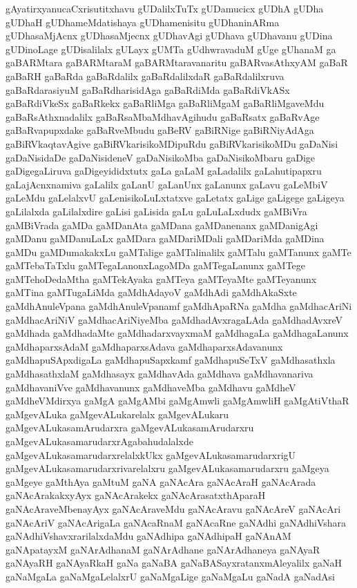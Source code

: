 {gAyatirxyanucaCxrisutitxhavu
gUDalilxTuTx
gUDamucicx
gUDhA
gUDha
gUDhaH
gUDhameMdatishaya
gUDhamenisitu
gUDhaninARma
gUDhasaMjAcnx
gUDhasaMjecnx
gUDhavAgi
gUDhava
gUDhavanu
gUDina
gUDinoLage
gUDisalilalx
gULayx
gUMTa
gUdhwravaduM
gUge
gUhanaM
ga
gaBARMtara
gaBARMtaraM
gaBARMtaravanaritu
gaBARvasAthxyAM
gaBaR
gaBaRH
gaBaRda
gaBaRdalilx
gaBaRdalilxdaR
gaBaRdalilxruva
gaBaRdarasiyuM
gaBaRdharisidAga
gaBaRdiMda
gaBaRdiVkASx
gaBaRdiVkeSx
gaBaRkekx
gaBaRliMga
gaBaRliMgaM
gaBaRliMgaveMdu
gaBaRsAthxnadalilx
gaBaRsaMbaMdhavAgihudu
gaBaRsatx
gaBaRvAge
gaBaRvapupxdake
gaBaRveMbudu
gaBeRV
gaBiRNige
gaBiRNiyAdAga
gaBiRVkaqtavAgive
gaBiRVkarisikoMDipuRdu
gaBiRVkarisikoMDu
gaDaNisi
gaDaNisidaDe
gaDaNisideneV
gaDaNisikoMba
gaDaNisikoMbaru
gaDige
gaDigegaLiruva
gaDigeyididxtutx
gaLa
gaLaM
gaLadalilx
gaLahutipapxru
gaLajAcnxnamiva
gaLalilx
gaLanU
gaLanUnx
gaLanunx
gaLavu
gaLeMbiV
gaLeMdu
gaLelalxvU
gaLenisikoLuLxtatxve
gaLetatx
gaLige
gaLigege
gaLigeya
gaLilalxda
gaLilalxdire
gaLisi
gaLisida
gaLu
gaLuLaLxdudx
gaMBiVra
gaMBiVrada
gaMDa
gaMDanAta
gaMDana
gaMDanenanx
gaMDanigAgi
gaMDanu
gaMDanuLaLx
gaMDara
gaMDariMDali
gaMDariMda
gaMDina
gaMDu
gaMDumakakxLu
gaMTalige
gaMTalinalilx
gaMTalu
gaMTanunx
gaMTe
gaMTebaTaTxlu
gaMTegaLanonxLagoMDa
gaMTegaLanunx
gaMTege
gaMTehoDedaMtha
gaMTekAyaka
gaMTeya
gaMTeyaMte
gaMTeyanunx
gaMTina
gaMTugaLiMda
gaMdhAdayoV
gaMdhAdi
gaMdhAkaSxte
gaMdhAnuleVpana
gaMdhAnuleVpanamf
gaMdhApaRNa
gaMdha
gaMdhacAriNi
gaMdhacAriNiV
gaMdhacAriNiyeMba
gaMdhadAvxragaLAda
gaMdhadAvxreV
gaMdhada
gaMdhadaMte
gaMdhadarxvayxmaM
gaMdhagaLa
gaMdhagaLanunx
gaMdhaparxsAdaM
gaMdhaparxsAdava
gaMdhaparxsAdavanunx
gaMdhapuSApxdigaLa
gaMdhapuSapxkamf
gaMdhapuSeTxV
gaMdhasathxla
gaMdhasathxlaM
gaMdhasayx
gaMdhavAda
gaMdhava
gaMdhavanariva
gaMdhavaniVve
gaMdhavanunx
gaMdhaveMba
gaMdhavu
gaMdheV
gaMdheVMdirxya
gaMgA
gaMgAMbi
gaMgAmwli
gaMgAmwliH
gaMgAtiVthaR
gaMgevALuka
gaMgevALukarelalx
gaMgevALukaru
gaMgevALukasamArudarxra
gaMgevALukasamArudarxru
gaMgevALukasamarudarxrAgabahudalalxde
gaMgevALukasamarudarxrelalxkUkx
gaMgevALukasamarudarxrigU
gaMgevALukasamarudarxrivarelalxru
gaMgevALukasamarudarxru
gaMgeya
gaMgeye
gaMthAya
gaMtuM
gaNA
gaNAcAra
gaNAcAraH
gaNAcArada
gaNAcArakakxyAyx
gaNAcArakekx
gaNAcArasatxthAparaH
gaNAcAraveMbenayAyx
gaNAcAraveMdu
gaNAcAravu
gaNAcAreV
gaNAcAri
gaNAcAriV
gaNAcArigaLa
gaNAcaRnaM
gaNAcaRne
gaNAdhi
gaNAdhiVshara
gaNAdhiVshavxrarilalxdaMdu
gaNAdhipa
gaNAdhipaH
gaNAnAM
gaNApatayxM
gaNArAdhanaM
gaNArAdhane
gaNArAdhaneya
gaNAyaR
gaNAyaRH
gaNAyaRkaH
gaNa
gaNaBA
gaNaBASayxratanxmAleyalilx
gaNaH
gaNaMgaLa
gaNaMgaLelalxrU
gaNaMgaLige
gaNaMgaLu
gaNadA
gaNadAsi
}

